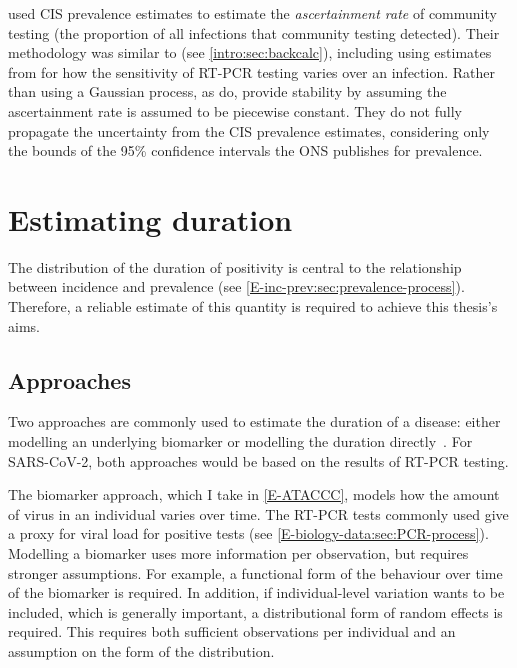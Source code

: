 \documentclass[thesis.tex]{subfiles}
\begin{document}
\Textcite{colmanAscertainment} used CIS prevalence estimates to estimate the \emph{ascertainment rate} of community testing (the proportion of all infections that community testing detected).
Their methodology was similar to \textcite{abbottCISincidence} (see \cref{intro:sec:backcalc}), including using estimates from \textcite{hellewellPCRSensitivity} for how the sensitivity of RT-PCR testing varies over an infection.
Rather than using a Gaussian process, as \textcite{abbottCISincidence} do, \textcite{colmanAscertainment} provide stability by assuming the ascertainment rate is assumed to be piecewise constant.
They do not fully propagate the uncertainty from the CIS prevalence estimates, considering only the bounds of the 95\% confidence intervals the ONS publishes for prevalence.

    \section{Estimating duration} \label{intro:sec:duration}

The distribution of the duration of positivity is central to the relationship between incidence and prevalence (see \cref{E-inc-prev:sec:prevalence-process}).
Therefore, a reliable estimate of this quantity is required to achieve this thesis's aims.

\subsection{Approaches}

Two approaches are commonly used to estimate the duration of a disease: either modelling an underlying biomarker or modelling the duration directly~\autocite{sweetingEstimating}.
For SARS-CoV-2, both approaches would be based on the results of RT-PCR testing.

The biomarker approach, which I take in \cref{E-ATACCC}, models how the amount of virus in an individual varies over time.
The RT-PCR tests commonly used give a proxy for viral load for positive tests (see \cref{E-biology-data:sec:PCR-process}).
Modelling a biomarker uses more information per observation, but requires stronger assumptions.
For example, a functional form of the behaviour over time of the biomarker is required.
In addition, if individual-level variation wants to be included, which is generally important, a distributional form of random effects is required.
This requires both sufficient observations per individual and an assumption on the form of the distribution.
\end{document}
